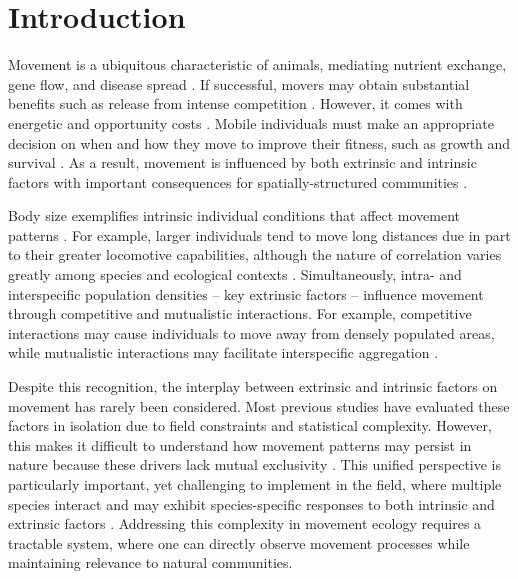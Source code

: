 \documentclass[11pt, class=article, crop=false]{standalone}
\begin{document}
\newpage

\section{Introduction}

Movement is a ubiquitous characteristic of animals, mediating nutrient exchange, gene flow, and disease spread \citep{cookeMovementEcologyFishes2022, hessDiseaseMetapopulationModels1996, teruiParasiteInfectionInduces2017, fauschLandscapesRiverscapesBridging2002}.
If successful, movers may obtain substantial benefits such as release from intense competition \citep{clobertDispersalEcologyEvolution2012}.
However, it comes with energetic and opportunity costs \citep{bonteCostsDispersal2012}.
Mobile individuals must make an appropriate decision on when and how they move to improve their fitness, such as growth and survival \citep{bonteCostsDispersal2012}. As a result, movement is influenced by both extrinsic and intrinsic factors with important consequences for spatially-structured communities \citep{leiboldMetacommunityConceptFramework2004, mcpeekEvolutionPassiveDispersal2024, schlagelMovementmediatedCommunityAssembly2020}. 

Body size exemplifies intrinsic individual conditions that affect movement patterns \citep{clobertDispersalEcologyEvolution2012}. For example,  larger individuals tend to move long distances due in part to their greater locomotive capabilities, although the nature of correlation varies greatly among species and ecological contexts \citep{comteEvidenceDispersalSyndromes2018, teruiParasiteInfectionInduces2017, radingerPatternsPredictorsFish2014, debeffeConditiondependentNatalDispersal2012,gilliamMovementCorridorsEnhancement2001}.
Simultaneously, intra- and interspecific population densities -- key extrinsic factors -- influence movement through competitive and mutualistic interactions. For example, competitive interactions may cause individuals to move away from densely populated areas, while mutualistic interactions may facilitate interspecific aggregation \citep{thierryInterplayAbioticBiotic2024, rasmussenIndividualMovementStream2017}.

Despite this recognition, the interplay between extrinsic and intrinsic factors on movement has rarely been considered. Most previous studies have evaluated these factors in isolation due to field constraints and statistical complexity. However, this makes it difficult to understand how movement patterns may persist in nature because these drivers lack mutual exclusivity \citep{mcmahonLinkingHabitatSelection2006}. 
This unified perspective is particularly important, yet challenging to implement in the field, where multiple species interact and may exhibit species-specific responses to both intrinsic and extrinsic factors \citep{teruiNonrandomDispersalSympatric2021}. Addressing this complexity in movement ecology requires a tractable system, where one can directly observe movement processes while maintaining relevance to natural communities.
\end{document}
